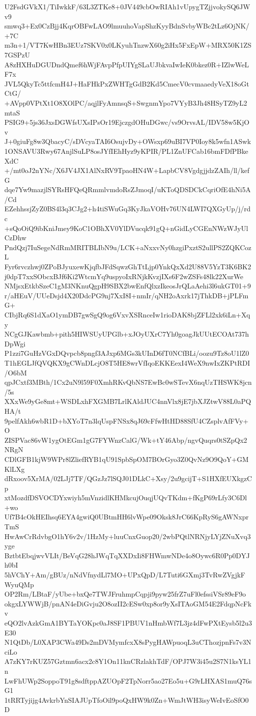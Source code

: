 U2FsdGVkX1/TiIwkkF/63L3ZTKe8+0JV449cbOwRIAh1vUpygTZjjvokySQ6JWv9
smwq3+Ex0CzBjj4KqrOBFwLAO9lmuuhoVapShzKyyBdnSvbyWBc2tLz6OjNK/+7C
m3n+1/VT7KwHBn3EUz7SKV0x0LKyuhTnzwX60g2iHx5FxEpW+MRX50K1ZS7GSPzU
A8zHXHuDGUDndQmef6hWjFAvpPfpUIYgSLaUJbkvaIwIeK0bkez0R+IZlwWeLF7x
JVL5QkyTc5ttfcmH4J+HaFHkPxZWHTgGdB2Kd5CmecV0cvmaaedyVeX18oGtCtG/
+AVpp0VPtXt1O8XOlPC/aqjlFyAmnsqS+SwgnmYpo7VYyB3Jh48HSyTZ9yL2mtaS
PSIG9+5js36JxsDGWfsUXsIPsOr19EjczgdOHuDGwc/vs9OrvsAL/IDV58w5KjOv
J+0giuFg8w3QbacyC/sDVcyaTAI6OsujvDy+OWsxp69uBI7VP0Ioy8k5wfn1ASwk
1ONSAVU3Rwy67AnjlSuLP8osJYfIEhHyz9yKPIR/PL1ZnUFCab16bmFDfPBkeXdC
+/mt0oJ2nYNc/X6JV4JX1AlNxRV9TpaoHN4W+LapbCV8VgdgjjdzZAIh/ll/kefG
dqe7Yw9mazjlSYRsHFQeQRmmlvmdoRsZJmoqI/uKToQDSDCkCqriOfE4hNi5A/Cd
EZehhssjZyZ0BS4l3q3CJg2+h4tiSWuGq3KyJkaVOHv76UN4LWI7QXGyUp/j/rdc
+sQoOiQ9ibKniJmey9KoC1OBhXV0YlDVucqk91gQ+nGidLyCGEnNWzWJyUlCzDhw
PndQzj7IuSegeNdRmMRITBLIbN9u/LCK+aNxxvNy0hzgiPxztS2ullPS2ZQKCozL
Fyr6rvczhwj0ZPoBJyuxewKjqfbJFdSqwzGhTtLjp0YnkQxXd2U88V5YzT3K6BK2
j0dpT7xxSObcxBJf6Ki2WtcmYq9uspyoIxRNjkKvzjIXs6F2wZSFs48lk22XurWe
NMjsxEtkbSzeC1gM3NKnuQgpH9SBX2bwEnfQlxzIkeosJrQLaAehi3l6ukGT01+9
r/aHEuV/UUeDsjd4X20DdcPG9nj7XxI8I+nmIr/qNH2oAxrk17jThkDB+jPLFmG+
CIbjRq6S1dXaO1ymDB7gwSgQ9og6VxvXSRnceIw1rioDAK8bjZFLl2xk6iLn+Xqy
NCgGJKawbmb+pith5HIWSUyUPGlb+xJOyUXrC7Yh0goagJkUUtECOAt737hDpWgi
P1zzi7GuHzVGxDQvpcb8pngf3AJxp6MGs3kUInD6fT0NCfBLi/oozu9Tz8oU1lZ0
T1hEGLJfQVQKX9gCWnDLcjO8T5HE8wrVfIqoEKKEexI4WeX9nwIxZKPtRDI/O6bM
qpJCxtf3MBth/1Cx2uN9l59F0XmhRKvQbNS7EwBc0wSTevX6nqUzTHSWK8jcn/5s
XXxWe9yGe8mt+WSDLxhFXGMB7LrlKAldJUC4nnVlx8jE7jbXJZtwV88L0aPQHA/t
9pelfAkh6wbR1D+bXYoT7n3lqUspFNSx8qJ69cFfwHtHD88SfU4CZsplvAfFVy+O
ZISPVac86vW1ygOtEGm1gG7FYWnzCalG/Wk+tY46Abp/ngvQuqrs0tSZpQx2NRgN
CDlGFB1kjW9WPr8lZliefRYB1qU91SpbSpOM7BOrGyo3Z0QvNz9O9QoY+GMKlLXg
dRxoov5XrMA/02LJj7TF/QGzJz7lSQJ01DLkC+Xsy/2u9gcijT+S1HXfEUXkgzCp
xtMozdfDSVOCDYxwiyh5mVnzidlKHMkcujOuqjUQvTKdm+fKgP69rLfy3C6Dl+wo
Uf7B4cOkHEIhsq6EYA4gwiQ0UBtmHH6lvWpe09Oksk8JrC66KpRyS6gAWNxprTmS
HwAwCrRdvbgO1hY6v2v/1HzMy+luuCnxGuop20/2wbPQtlNRNjyLYjZNuXvq3yge
BztbtEbqjwvVLIt/BeVqG28hJWqTqXXDxIi8FHWmwNDe4o8Oywc6R0Pp0DYJh0bI
5hVChY+Am/gBUz/nNdVfnydLl7MO+UPxQpD/L7Tuti6GXmj3TvRwZVgjkFWyuQMp
OP2Rm/LBtaF/yUbe+bxQe7TWJFruhmpCqpji9pyw25frZ7uFl0efssiVSr89eF9o
okgxLYWWjB/pnAN4eDiGvju2O8ozII2cESw0xp8or9yXsITAoGM54E2FdqpNcFkv
eQO2lvAzkGmA1BYTaYOKpc0aJ8SF1PBUV1nHmbWf7L3jz4dFwPXtEysb5l2u3E30
N1QtDb/L0XAP3CWa49Ds2mDVMymfcxX8sPygHAWpuoqL3uCThozjpnFs7v3NciLo
A7zKY7rKUZ57Gztmn6acx2c8Y1On11knCRzlakhTdF/OPJ7W3i45u2S7N1ksYL1n
LwFhUWp2SoppoT91g8sdftppAZUOpF2TpNorr5ao27Eo5u+G9rLHXAS1muQ76sG1
1tRRTyjijg4AvkrbYnSIAJUpTfoOil9poQxHW9k0Zn+WmJtWH3isyWeIvEoSfO0D
